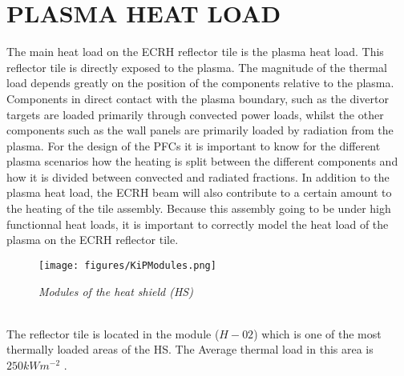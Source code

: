 \section{PLASMA HEAT LOAD} \label{PlasmaHLonKiPModules}
\normalsize{The main heat load on the \acrshort{ECRH} reflector tile is the plasma heat load. This reflector tile is directly exposed to the plasma. The magnitude of the thermal load depends greatly on the position of the components relative to the plasma. Components in direct contact with the plasma boundary, such as the divertor targets are loaded primarily through convected power loads, whilst the other components such as the wall panels are primarily loaded by radiation from the plasma. For the design of the \acrshort{PFCs} it is important to know for the different plasma scenarios how the heating is split between the different components and how it is divided between convected and radiated fractions. In addition to the plasma heat load, the \acrshort{ECRH} beam will also contribute to a certain amount to the heating of the tile assembly. Because this assembly going to be under high functionnal heat loads, it is important to correctly model the heat load of the plasma on the \acrshort{ECRH} reflector tile.}
\\
\begin{figure}[h!]
    \label{fig_4_3_0} 
    \centering
    \texttt{[image: figures/KiPModules.png]}
    \caption{\it Modules of the heat shield (\acrshort{HS})}
\end{figure}
\\
\normalsize{\indent The reflector tile is located in the module ($H-02$) which is one of the most thermally loaded areas of the \acrshort{HS}. The Average thermal load in this area is $250 \unit{kWm^{-2}}$ \cite{Van_Eeten_2022}.}
\newpage